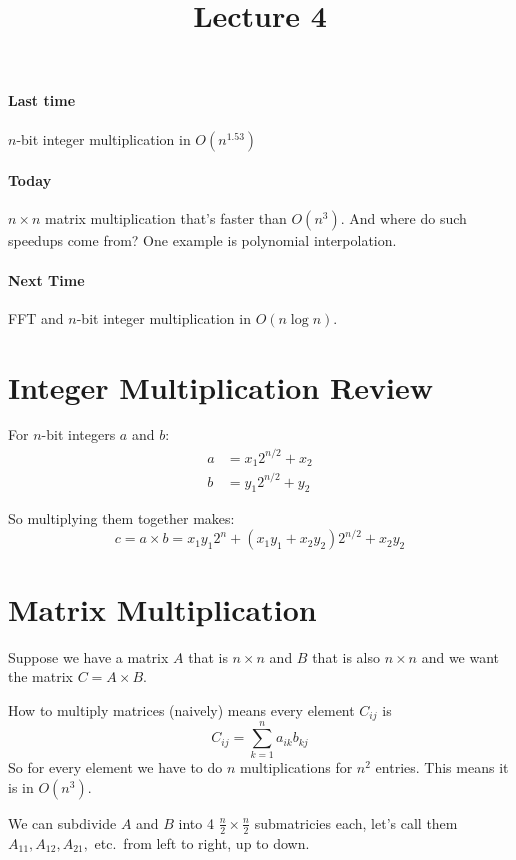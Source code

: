 \documentclass{article}
\title{Lecture 4}
\begin{document}
\maketitle

\paragraph{Last time} $n$-bit integer multiplication in $O(n^{1.53})$

\paragraph{Today} $n \times n$ matrix multiplication that's faster than $O(n^3)$. And where do such speedups come from? One example is polynomial interpolation.

\paragraph{Next Time} FFT and $n$-bit integer multiplication in $O(n\log{n})$.

\section{Integer Multiplication Review}

For $n$-bit integers $a$ and $b$:
\begin{align*}
    a &= x_1 2^{n/2} + x_2 \\
    b &= y_1 2^{n/2} + y_2
\end{align*}

So multiplying them together makes:
$$
c = a \times b = x_1 y_1 2^n + (x_1 y_1 + x_2 y_2) 2^{n/2} + x_2 y_2
$$

\section{Matrix Multiplication}

Suppose we have a matrix $A$ that is $n \times n$ and $B$ that is also $n \times n$ and we want the matrix $C = A \times B$.

How to multiply matrices (naively) means every element $C_{ij}$ is
$$
C_{ij} = \sum_{k = 1}^n a_{ik} b_{kj}
$$
So for every element we have to do $n$ multiplications for $n^2$ entries. This means it is in $O(n^3)$.

We can subdivide $A$ and $B$ into 4 $\frac{n}{2} \times \frac{n}{2}$ submatricies each, let's call them $A_{11}, A_{12}, A_{21}, $ etc.\ from left to right, up to down.
\end{document}
